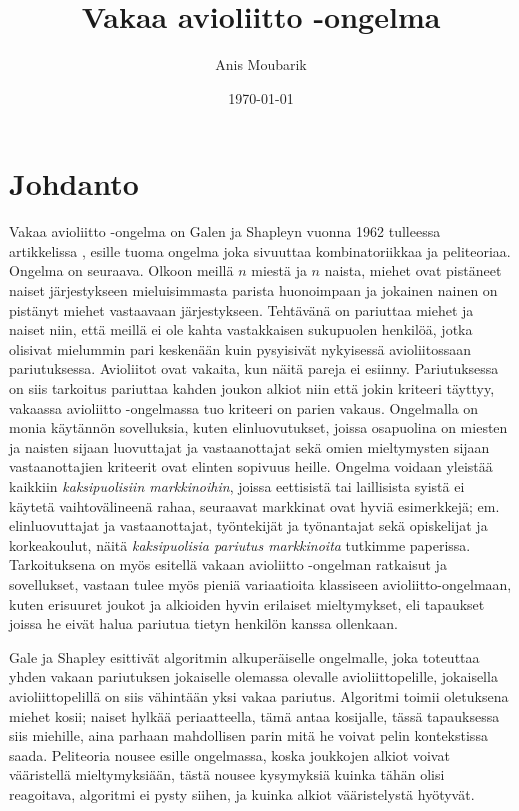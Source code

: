 \documentclass[finnish]{tktltiki2}
\title{Vakaa avioliitto -ongelma}
\author{Anis Moubarik}
\date{\today}
\theoremstyle{definition}
\theoremstyle{remark}
\begin{document}

\maketitle        %

\tableofcontents  %
\newpage          %



\section{Johdanto}
Vakaa avioliitto -ongelma on Galen ja Shapleyn vuonna 1962 tulleessa artikkelissa \cite{gale62a}, esille tuoma ongelma joka sivuuttaa kombinatoriikkaa ja peliteoriaa. Ongelma on seuraava. Olkoon meillä $n$ miestä ja $n$ naista, miehet ovat pistäneet naiset järjestykseen mieluisimmasta parista huonoimpaan ja jokainen nainen on pistänyt miehet vastaavaan järjestykseen. Tehtävänä on pariuttaa miehet ja naiset niin, että meillä ei ole kahta vastakkaisen sukupuolen henkilöä, jotka olisivat mielummin pari keskenään kuin pysyisivät nykyisessä avioliitossaan pariutuksessa. Avioliitot ovat vakaita, kun näitä pareja ei esiinny. Pariutuksessa on siis tarkoitus pariuttaa kahden joukon alkiot niin että jokin kriteeri täyttyy, vakaassa avioliitto -ongelmassa tuo kriteeri on parien vakaus.
Ongelmalla on monia käytännön sovelluksia, kuten elinluovutukset, joissa osapuolina on miesten ja naisten sijaan luovuttajat ja vastaanottajat sekä omien mieltymysten sijaan vastaanottajien kriteerit ovat elinten sopivuus heille. Ongelma voidaan yleistää kaikkiin \emph{kaksipuolisiin markkinoihin}, joissa eettisistä tai laillisista syistä ei käytetä vaihtovälineenä rahaa, seuraavat markkinat ovat hyviä esimerkkejä; em. elinluovuttajat ja vastaanottajat, työntekijät ja työnantajat sekä opiskelijat ja korkeakoulut, näitä \emph{kaksipuolisia pariutus markkinoita} tutkimme paperissa. Tarkoituksena on myös esitellä vakaan avioliitto -ongelman ratkaisut ja sovellukset, vastaan tulee myös pieniä variaatioita klassiseen avioliitto-ongelmaan, kuten erisuuret joukot ja alkioiden hyvin erilaiset mieltymykset, eli tapaukset joissa he eivät halua pariutua tietyn henkilön kanssa ollenkaan.

Gale ja Shapley esittivät algoritmin alkuperäiselle ongelmalle, joka toteuttaa yhden vakaan pariutuksen jokaiselle olemassa olevalle avioliittopelille, jokaisella avioliittopelillä on siis vähintään yksi vakaa pariutus. Algoritmi toimii oletuksena miehet kosii; naiset hylkää periaatteella, tämä antaa kosijalle, tässä tapauksessa siis miehille, aina parhaan mahdollisen parin mitä he voivat pelin kontekstissa saada.
Peliteoria nousee esille ongelmassa, koska joukkojen alkiot voivat vääristellä mieltymyksiään, tästä nousee kysymyksiä kuinka tähän olisi reagoitava, algoritmi ei pysty siihen, ja kuinka alkiot vääristelystä hyötyvät.
\end{document}
